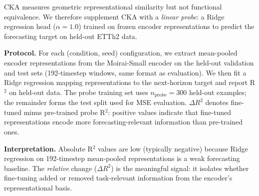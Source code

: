 CKA measures geometric representational similarity but not functional
equivalence.  We therefore supplement CKA with a \emph{linear probe}:
a Ridge regression head ($\alpha{=}1.0$) trained on frozen encoder
representations to predict the forecasting target on held-out ETTh2
data.

\textbf{Protocol.}
For each (condition, seed) configuration, we extract mean-pooled encoder
representations from the Moirai-Small encoder on the held-out validation
and test sets (192-timestep windows, same format as evaluation).
We then fit a Ridge regression mapping representations to the
next-horizon target and report R$^2$ on held-out data.
The probe training set uses $n_{\text{probe}}{=}300$ held-out examples;
the remainder forms the test split used for MSE evaluation.
$\Delta R^2$ denotes fine-tuned minus pre-trained probe R$^2$:
positive values indicate that fine-tuned representations encode
more forecasting-relevant information than pre-trained ones.

\textbf{Interpretation.}
Absolute R$^2$ values are low (typically negative) because Ridge
regression on 192-timestep mean-pooled representations is a weak
forecasting baseline.  The \emph{relative} change ($\Delta R^2$)
is the meaningful signal: it isolates whether fine-tuning added
or removed task-relevant information from the encoder's
representational basis.

